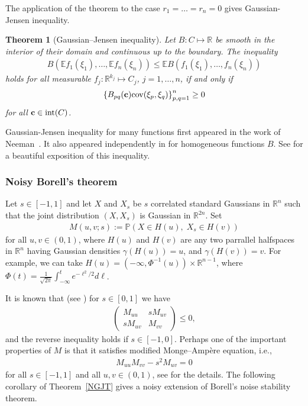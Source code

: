 \documentclass[9pt, a4paper]{amsart}
\newcommand{\1}{{\chi_{}}}%
\newtheorem{atheorem}{Theorem}[section]
\numberwithin{equation}{section}
\begin{document}
The application of the theorem to the case $r_{1}=\ldots=r_{n}=0$ gives Gaussian-Jensen inequality.
\begin{atheorem}[Gaussian--Jensen inequality]\label{GJI}
Let $B : C \mapsto \mathbb{R}$ be smooth in the interior of their domain and continuous up to the boundary. The inequality 
\begin{align}\label{GJid}
     B(\mathbb{E}f_{1}(\xi_{1}), \ldots, \mathbb{E}f_{n}(\xi_{n})) \leq \mathbb{E} B(f_{1}(\xi_{1}), \ldots, f_{n}(\xi_{n}))
\end{align}
holds for all measurable $f_{j} : \mathbb{R}^{k_{j}} \mapsto  C_{j}$, $j=1, \ldots, n$,  if and only if 
\begin{align}
    \left\{B_{pq}({\bf c}) \mathrm{cov}(\xi_{p}, \xi_{q}) \right\}_{p,q=1}^{n}\geq 0
\end{align}
for all ${\bf c} \in \mathrm{int}(C)$.   
\end{atheorem}
Gaussian-Jensen inequality for many functions first appeared in the work of Neeman~\cite{Neeman14}. It also appeared independently in \cite{IvanVol2015} for homogeneous functions $B$. See \cite{LedouxSlepian} for a beautiful exposition of this inequality. 

\subsubsection{Noisy Borell's theorem}\label{noiboy}

Let $s \in [-1,1]$ and let $X$ and $X_{s}$ be $s$ correlated standard Gaussians in $\mathbb{R}^{n}$ such that the joint distribution $(X, X_{s})$ is Gaussian in $\mathbb{R}^{2n}$. Set
\begin{align*}
    M(u,v; s) := \mathbb{P}(X\in H(u), \; X_{s} \in H(v))
\end{align*}
for all $u,v \in (0,1)$, where $H(u)$ and $H(v)$ are any two parrallel halfspaces in $\mathbb{R}^{n}$ having Gaussian densities $\gamma(H(u))=u$, and $\gamma (H(v))=v$. For example, we can take $H(u) = (-\infty, \Phi^{-1}(u))\times \mathbb{R}^{n-1}$, where $\Phi(t) = \frac{1}{\sqrt{2\pi}}\int_{-\infty}^{t} e^{-\ell^{2}/2}d\ell$. 


It is known that (see \cite{MosselNeeman15}) for $s \in [0,1]$ we have 
\begin{align}\label{matin01}
    \begin{pmatrix}
        M_{uu} & s M_{uv}\\
        s M_{uv} & M_{vv}
    \end{pmatrix} \leq 0,
\end{align}
and the reverse inequality holds if $s \in [-1,0]$. Perhaps one of the important properties of $M$ is that it satisfies modified Monge--Amp\`ere equation, i.e., 
\begin{align*}
    M_{uu}M_{vv}-s^{2} M_{uv}=0
\end{align*}
for all $s \in [-1,1]$ and all $u,v \in (0,1)$, see \cite{MosselNeeman15, IvanVol15} for the details. The following corollary of Theorem~\ref{NGJT} gives a noisy extension of Borell's noise stability theorem. 
\end{document}
